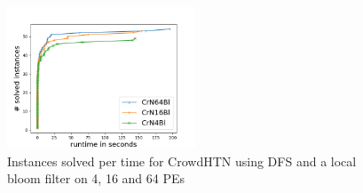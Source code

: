 \begin{figure}[!hbp]
	\caption{Instances solved per time for CrowdHTN using DFS and a local bloom filter on 4, 16 and 64 PEs}
	\label{figure: eval scalability}
	\centering
	\includegraphics[width=0.5\textwidth]{images/final/scalability}
\end{figure}
